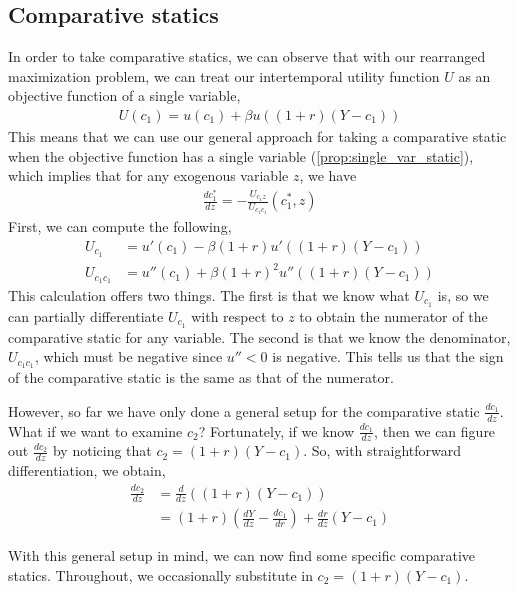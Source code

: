 \subsection*{Comparative statics}
In order to take comparative statics, we can observe that with our rearranged maximization problem, we can treat our intertemporal utility function $U$ as an objective function of a single variable,
\begin{align*}
    U(c_1) = u(c_1) + \beta u((1 + r) (Y - c_1))
\end{align*}
This means that we can use our general approach for taking a comparative static when the objective function has a single variable (\ref{prop:single_var_static}), which implies that for any exogenous variable $z$, we have
\begin{align*}
    \frac{dc_1^*}{dz} = -\frac{U_{c_1 z}}{U_{c_1 c_1}}(c_1^*, z)
\end{align*}
First, we can compute the following,
\begin{align*}
    U_{c_1} &= u'(c_1) - \beta (1 + r) u'((1 + r)(Y - c_1))\\ 
    U_{c_1 c_1} &= u''(c_1) + \beta (1+r)^2 u''((1 + r) (Y - c_1))
\end{align*}
This calculation offers two things. The first is that we know what $U_{c_1}$ is, so we can partially differentiate $U_{c_1}$ with respect to $z$ to obtain the numerator of the comparative static for any variable. The second is that we know the denominator, $U_{c_1 c_1}$, which must be negative since $u'' < 0$ is negative. This tells us that the sign of the comparative static is the same as that of the numerator.

However, so far we have only done a general setup for the comparative static $\frac{dc_1}{dz}$. What if we want to examine $c_2$? Fortunately, if we know $\frac{dc_1}{dz}$, then we can figure out $\frac{dc_2}{dz}$ by noticing that $c_2 = (1 + r)(Y - c_1)$. So, with straightforward differentiation, we obtain,
\begin{align*}
    \frac{dc_2}{dz} &= \frac{d}{dz} \left((1 + r) (Y - c_1)\right) \\
    &= (1 + r)\left(\frac{dY}{dz} - \frac{dc_1}{dr}\right) + \frac{dr}{dz}(Y - c_1)
\end{align*}

With this general setup in mind, we can now find some specific comparative statics. Throughout, we occasionally substitute in $c_2 = (1 + r) (Y - c_1)$. 

